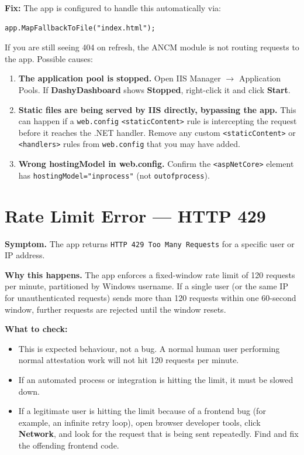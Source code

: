 \documentclass[a4paper,11pt]{article}
\begin{document}
\textbf{Fix:}
The app is configured to handle this automatically via:

\begin{lstlisting}[language={}]
app.MapFallbackToFile("index.html");
\end{lstlisting}

If you are still seeing 404 on refresh, the ANCM module is not routing requests
to the app. Possible causes:

\begin{enumerate}
  \item \textbf{The application pool is stopped.}
        Open IIS Manager $\rightarrow$ Application Pools.
        If \textbf{DashyDashboard} shows \textbf{Stopped}, right-click it
        and click \textbf{Start}.
  \item \textbf{Static files are being served by IIS directly, bypassing the app.}
        This can happen if a \texttt{web.config} \texttt{<staticContent>} rule is
        intercepting the request before it reaches the .NET handler.
        Remove any custom \texttt{<staticContent>} or \texttt{<handlers>} rules
        from \texttt{web.config} that you may have added.
  \item \textbf{Wrong hostingModel in web.config.}
        Confirm the \texttt{<aspNetCore>} element has
        \texttt{hostingModel="inprocess"} (not \texttt{outofprocess}).
\end{enumerate}

\section{Rate Limit Error --- HTTP 429}
\label{sec:ratelimit}

\textbf{Symptom.}
The app returns \texttt{HTTP 429 Too Many Requests}
for a specific user or IP address.

\textbf{Why this happens.}
The app enforces a fixed-window rate limit of 120 requests per minute,
partitioned by Windows username.
If a single user (or the same IP for unauthenticated requests) sends more than
120 requests within one 60-second window, further requests are rejected until
the window resets.

\textbf{What to check:}

\begin{itemize}
  \item This is expected behaviour, not a bug.
        A normal human user performing normal attestation work will not hit 120
        requests per minute.
  \item If an automated process or integration is hitting the limit,
        it must be slowed down.
  \item If a legitimate user is hitting the limit because of a frontend bug
        (for example, an infinite retry loop), open browser developer tools,
        click \textbf{Network}, and look for the request that is being
        sent repeatedly.
        Find and fix the offending frontend code.
\end{itemize}
\end{document}
